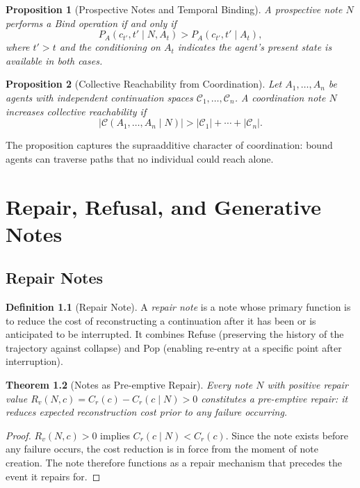 \documentclass[12pt, a4paper, openany]{book}
\theoremstyle{plain}
\newtheorem{theorem}{Theorem}[chapter]
\newtheorem{proposition}[theorem]{Proposition}
\theoremstyle{definition}
\newtheorem{definition}[theorem]{Definition}
\theoremstyle{remark}
\newcommand{\calC}{\mathcal{C}}
\begin{document}
\begin{proposition}[Prospective Notes and Temporal Binding]
A prospective note $N$ performs a Bind operation if and only if
\[
P_A(c_{t'}, t' \mid N, A_t) > P_A(c_{t'}, t' \mid A_t),
\]
where $t' > t$ and the conditioning on $A_t$ indicates the agent's present state
is available in both cases.
\end{proposition}

\begin{proposition}[Collective Reachability from Coordination]
Let $A_1, \ldots, A_n$ be agents with independent continuation spaces
$\calC_1, \ldots, \calC_n$. A coordination note $N$ increases collective
reachability if
\[
|\calC(A_1, \ldots, A_n \mid N)| > |\calC_1| + \cdots + |\calC_n|.
\]
\end{proposition}

The proposition captures the supraadditive character of coordination: bound agents
can traverse paths that no individual could reach alone.

\chapter{Repair, Refusal, and Generative Notes}

\section{Repair Notes}

\begin{definition}[Repair Note]
A \emph{repair note} is a note whose primary function is to reduce the cost of
reconstructing a continuation after it has been or is anticipated to be
interrupted. It combines Refuse (preserving the history of the trajectory against
collapse) and Pop (enabling re-entry at a specific point after interruption).
\end{definition}

\begin{theorem}[Notes as Pre-emptive Repair]
Every note $N$ with positive repair value $R_v(N, c) = C_r(c) - C_r(c \mid N) > 0$
constitutes a pre-emptive repair: it reduces expected reconstruction cost prior
to any failure occurring.
\end{theorem}

\begin{proof}
$R_v(N, c) > 0$ implies $C_r(c \mid N) < C_r(c)$. Since the note exists before
any failure occurs, the cost reduction is in force from the moment of note
creation. The note therefore functions as a repair mechanism that precedes the
event it repairs for.
\end{proof}
\end{document}
